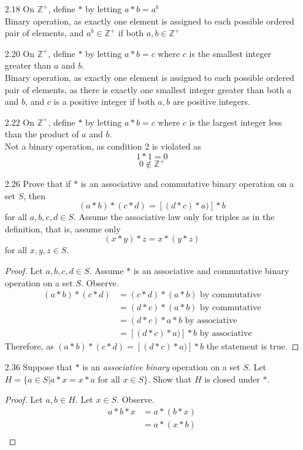 \documentclass[12pt]{article}
\newcommand{\Z}{\mathds{Z}}
\begin{document}
\begin{enumerate}
\begin{enumerate}
			\item[2.18] On $\Z^+$, define $*$ by letting $a*b = a^b$\\
				Binary operation, as exactly one element is assigned to each possible ordered pair of elements, and $a^b\in\Z^+$ if both $a,b\in\Z^+$
			\item[2.20] On $\Z^+$, define $*$ by letting $a * b = c$ where $c$ is the smallest integer greater than $a$ and $b$.\\
				Binary operation, as exactly one element is assigned to each possible ordered pair of elements, as there is exactly one smallest integer greater than both $a$ and $b$, and $c$ is a positive integer if both $a,b$ are positive integers.
			\item[2.22] On $\Z^+$, define $*$ by letting $a * b = c$ where $c$ is the largest integer less than the product of $a$ and $b$.\\
				Not a binary operation, as condition 2 is violated as
					 \[1*1=0\]
					 \[0\notin\Z^+\]
			\item[2.26] Prove that if $*$ is an associative and commutative binary operation on a set $S$, then \[ (a*b)*(c*d) = [(d*c)*a)]*b \] for all $a,b,c,d \in S$. Assume the associative law only for triples as in the definition, that is, assume only \[(x*y)*z = x*(y*z)\] for all $x,y,z \in S$.
				\begin{proof}
					Let $a,b,c,d \in S$. Assume $*$ is an associative and commutative binary operation on a set $S$. Observe. 
					\begin{align*}
						 (a*b)*(c*d) &= (c*d)*(a*b) \text{ by commutative} \\
						 			 &= (d*c)*(a*b) \text{ by commutative}\\
						 			 &= (d*c)*a*b \text{ by associative}\\
						 			 &= [(d*c)*a)]*b \text{ by associative}
					\end{align*}
					Therefore, as $(a*b)*(c*d) = [(d*c)*a)]*b$ the statement is true.
				\end{proof}
			\item[2.36] Suppose that $*$ is an \textit{associative binary} operation on a set $S$. Let $H = \{a \in S | a*x = x*a \text{ for all } x \in S\}$. Show that $H$ is closed under $*$. 
				\begin{proof}
					Let $a,b\in H$. Let $x \in S$. Observe.
					\begin{align*}
						a*b*x &= a * (b*x)\\
							  &= a * (x*b)\\

\end{align*}
\end{proof}
\end{enumerate}
\end{enumerate}
\end{document}
